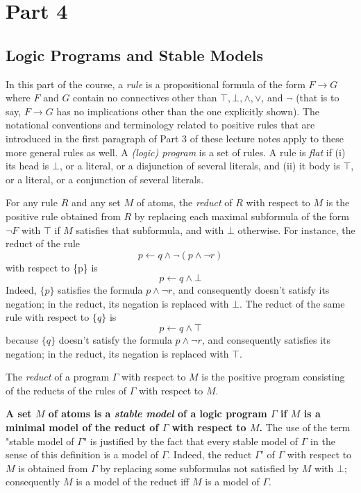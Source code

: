 \section{Part 4}
\subsection{Logic Programs and Stable Models}
In this part of the course, a \textit{rule} is a propositional formula of the form $F \rightarrow G$ where $F$ and $G$ contain no connectives other than $\top, \bot, \wedge, \vee$, and $\neg$ (that is to say, $F \rightarrow G$ has no implications other than the one explicitly shown). The notational conventions and terminology related to positive rules that are introduced in the first paragraph of Part 3 of these lecture notes apply to these more general rules as well. A \textit{(logic) program} is a set of rules. A rule is \textit{flat} if (i) its head is $\bot$, or a literal, or a disjunction of several literals, and (ii) it body is $\top$, or a literal, or a conjunction of several literals. 

For any rule $R$ and any set $M$ of atoms, the \textit{reduct} of $R$ with respect to $M$ is the positive rule obtained from $R$ by replacing each maximal subformula of the form $\neg F$ with $\top$ if $M$ satisfies that subformula, and with $\bot$ otherwise. For instance, the reduct of the rule
\begin{equation*}
p \leftarrow q \wedge \neg (p \wedge \neg r)
\end{equation*}
with respect to \{p\} is 
\begin{equation*}
p \leftarrow q \wedge \bot
\end{equation*}
Indeed, $\{p\}$ satisfies the formula $p \wedge \neg r$, and consequently doesn't satisfy its negation; in the reduct, its negation is replaced with $\bot$. The reduct of the same rule with respect to $\{q\}$ is 
\begin{equation*}
p \leftarrow q \wedge \top
\end{equation*}
because $\{q\}$ doesn't satisfy the formula $p \wedge \neg r$, and consequently satisfies its negation; in the reduct, its negation is replaced with $\top$. 

The \textit{reduct} of a program $\Gamma$ with respect to $M$ is the positive program consisting of the reducts of the rules of $\Gamma$ with respect to $M$. 

\textbf{A set $M$ of atoms is a \textit{stable model} of a logic program $\Gamma$ if $M$ is a minimal model of the reduct of $\Gamma$ with respect to $M$.} The use of the term "stable model of $\Gamma$" is justified by the fact that every stable model of $\Gamma$ in the sense of this definition is a model of $\Gamma$. Indeed, the reduct $\Gamma'$ of $\Gamma$ with respect to $M$ is obtained from $\Gamma$ by replacing some subformulas not satisfied by $M$ with $\bot$; consequently $M$ is a model of the reduct iff $M$ is a model of $\Gamma$. 

